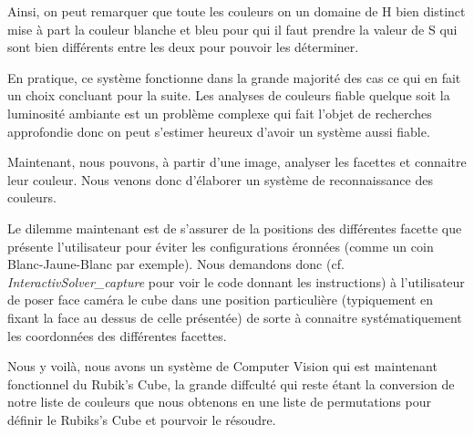 Ainsi, on peut remarquer que toute les couleurs on un domaine de H bien distinct mise à part la couleur blanche et bleu pour qui il faut prendre la valeur de S qui sont bien différents entre les deux pour pouvoir les déterminer.

En pratique, ce système fonctionne dans la grande majorité des cas ce qui en fait un choix concluant pour la suite. Les analyses de couleurs fiable quelque soit la luminosité ambiante est un problème complexe qui fait l'objet de recherches
approfondie donc on peut s'estimer heureux d'avoir un système aussi fiable.

Maintenant, nous pouvons, à partir d'une image, analyser les facettes et connaitre leur couleur. Nous venons donc d'élaborer un système de reconnaissance des couleurs.

Le dilemme maintenant est de s'assurer de la positions des différentes facette que présente l'utilisateur pour éviter les configurations éronnées (comme un coin Blanc-Jaune-Blanc par exemple).
Nous demandons donc (cf. \textit{InteractivSolver\_capture} pour voir le code donnant les instructions) à l'utilisateur de poser face caméra le cube dans une position particulière (typiquement en fixant la face au dessus de celle présentée) de sorte 
à connaitre systématiquement les coordonnées des différentes facettes.

Nous y voilà, nous avons un système de Computer Vision qui est maintenant fonctionnel du Rubik's Cube, la grande diffculté qui reste étant la conversion de notre liste de couleurs que nous obtenons en une liste de permutations pour définir le Rubiks's Cube
et pourvoir le résoudre.






